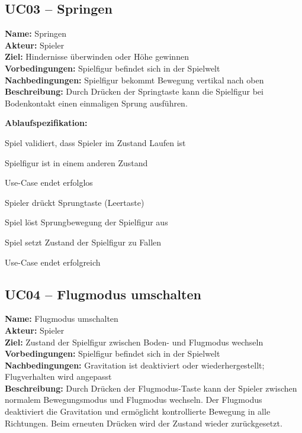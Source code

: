 \documentclass{article}
\begin{document}
\newpage
\subsection*{UC03 – Springen}

\textbf{Name:} Springen \\
\textbf{Akteur:} Spieler \\
\textbf{Ziel:} Hindernisse überwinden oder Höhe gewinnen \\
\textbf{Vorbedingungen:} Spielfigur befindet sich in der Spielwelt \\
\textbf{Nachbedingungen:} Spielfigur bekommt Bewegung vertikal nach oben\\
\textbf{Beschreibung:} Durch Drücken der Springtaste kann die Spielfigur bei Bodenkontakt einen einmaligen Sprung ausführen.

\textbf{Ablaufspezifikation:}
\begin{description}[style=nextline,leftmargin=1.9cm,labelwidth=1.6cm]
  \item[1.] Spiel validiert, dass Spieler im Zustand Laufen ist
  \item[1a.] Spielfigur ist in einem anderen Zustand
  \item[1a.1.] Use-Case endet erfolglos 
  \item[2.] Spieler drückt Sprungtaste (Leertaste)
  \item[3.] Spiel löst Sprungbewegung der Spielfigur aus
  \item[4.] Spiel setzt Zustand der Spielfigur zu Fallen
  \item[4.] Use-Case endet erfolgreich
\end{description}

\newpage

\subsection*{UC04 – Flugmodus umschalten}

\textbf{Name:} Flugmodus umschalten \\
\textbf{Akteur:} Spieler \\
\textbf{Ziel:} Zustand der Spielfigur zwischen Boden- und Flugmodus wechseln \\
\textbf{Vorbedingungen:} Spielfigur befindet sich in der Spielwelt \\
\textbf{Nachbedingungen:} Gravitation ist deaktiviert oder wiederhergestellt; Flugverhalten wird angepasst \\
\textbf{Beschreibung:} Durch Drücken der Flugmodus-Taste kann der Spieler zwischen normalem Bewegungsmodus und Flugmodus wechseln. Der Flugmodus deaktiviert die Gravitation und ermöglicht kontrollierte Bewegung in alle Richtungen. Beim erneuten Drücken wird der Zustand wieder zurückgesetzt.
\end{document}
